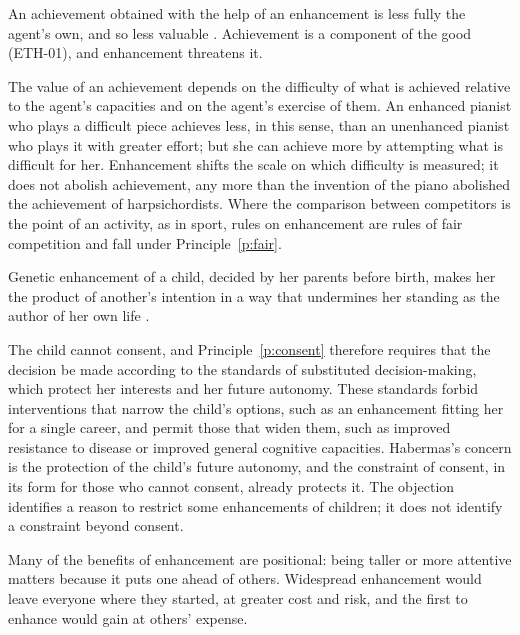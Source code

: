 \documentclass{situationist-preprint}
\begin{document}
\begin{objection}\label{o:kass}
An achievement obtained with the help of an enhancement is less fully the agent's own, and so less valuable \citep{Kass2003}. Achievement is a component of the good (ETH-01), and enhancement threatens it.
\end{objection}

\begin{reply}
The value of an achievement depends on the difficulty of what is achieved relative to the agent's capacities and on the agent's exercise of them. An enhanced pianist who plays a difficult piece achieves less, in this sense, than an unenhanced pianist who plays it with greater effort; but she can achieve more by attempting what is difficult for her. Enhancement shifts the scale on which difficulty is measured; it does not abolish achievement, any more than the invention of the piano abolished the achievement of harpsichordists. Where the comparison between competitors is the point of an activity, as in sport, rules on enhancement are rules of fair competition and fall under Principle~\ref{p:fair}.
\end{reply}

\begin{objection}\label{o:habermas}
Genetic enhancement of a child, decided by her parents before birth, makes her the product of another's intention in a way that undermines her standing as the author of her own life \citep{Habermas2003}.
\end{objection}

\begin{reply}
The child cannot consent, and Principle~\ref{p:consent} therefore requires that the decision be made according to the standards of substituted decision-making, which protect her interests and her future autonomy. These standards forbid interventions that narrow the child's options, such as an enhancement fitting her for a single career, and permit those that widen them, such as improved resistance to disease or improved general cognitive capacities. Habermas's concern is the protection of the child's future autonomy, and the constraint of consent, in its form for those who cannot consent, already protects it. The objection identifies a reason to restrict some enhancements of children; it does not identify a constraint beyond consent.
\end{reply}

\begin{objection}\label{o:position}
Many of the benefits of enhancement are positional: being taller or more attentive matters because it puts one ahead of others. Widespread enhancement would leave everyone where they started, at greater cost and risk, and the first to enhance would gain at others' expense.
\end{objection}
\end{document}
